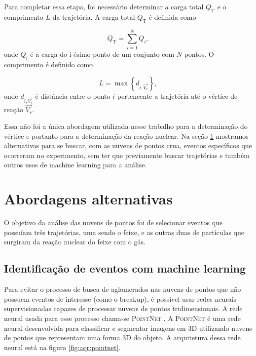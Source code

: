 \documentclass[a4paper,12pt,oneside]{book}
\begin{document}
\par Para completar essa etapa, foi necessário determinar a carga total $Q_\text{T}$ e o comprimento $L$ da trajetória. A carga total $Q_\text{T}$ é definida como

\begin{equation}\label{eq:carga_acumulada}
	Q_\text{T} = \sum_{i = 1}^{N} Q_i,
\end{equation}
%
onde $Q_i$ é a carga do i-ésimo ponto de um conjunto com $N$ pontos. O comprimento é definido como

\begin{equation}\label{eq:comprimento_trajetoria}
	L = \max \left\{  d_{i,\vec{V_r}} \right\},
\end{equation}
%
onde $d_{i, \vec{V_r}}$ é distância entre o ponto $i$ pertencente a trajetória até o vértice de reação $\vec{V_r}$.

\par Essa não foi a única abordagem utilizada nesse trabalho para a determinação do vértice e portanto para a determinação da reação nuclear. Na seção \ref{sec:abordagens_alternativas} mostramos alternativas para se buscar, com as nuvens de pontos crua, eventos específicos que ocorreram no experimento, sem ter que previamente buscar trajetórias e também outros usos de machine learning para a análise.

\section{Abordagens alternativas}\label{sec:abordagens_alternativas}

\par  O objetivo da análise das nuvens de pontos foi de selecionar eventos que possuíam três trajetórias, uma sendo o feixe, e as outras duas de partículas que surgiram da reação nuclear do feixe com o gás.

\subsection{Identificação de eventos com machine learning}\label{subsec:pointnet}

\par Para evitar o processo de busca de aglomerados nas nuvens de pontos que não possuem eventos de interesse (como o breakup), é possível usar redes neurais supervisionadas capazes de processar nuvens de pontos tridimensionais. A rede neural usada para esse processo chama-se \textsc{PointNet} \cite{qi2016pointnet}. A \textsc{PointNet} é uma rede neural desenvolvida para classificar e segmentar imagens em 3D utilizando nuvens de pontos que representam uma forma 3D do objeto. A arquitetura dessa rede neural está na figura \ref{fig:aqr:pointnet}.
\end{document}
